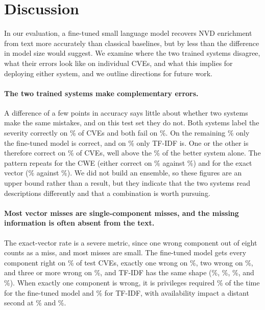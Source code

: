 \section{Discussion}\label{sec:discussion}

In our evaluation, a fine-tuned small language model recovers NVD enrichment from text more accurately than classical baselines, but by less than the difference in model size would suggest.
We examine where the two trained systems disagree, what their errors look like on individual CVEs, and what this implies for deploying either system, and we outline directions for future work.

\paragraph{The two trained systems make complementary errors.}
A difference of a few points in accuracy says little about whether two systems make the same mistakes, and on this test set they do not.
Both systems label the severity correctly on \nBothSev\% of CVEs and both fail on \nNeitherSev\%.
On the remaining \nLoRAOnlySev\% only the fine-tuned model is correct, and on \nLROnlySev\% only TF-IDF is.
One or the other is therefore correct on \nEitherSev\% of CVEs, well above the \nLoRAfSev\% of the better system alone.
The pattern repeats for the CWE (either correct on \nEitherCwe\% against \nLoRAfCwe\%) and for the exact vector (\nEitherVec\% against \nLoRAfVec\%).
We did not build an ensemble, so these figures are an upper bound rather than a result, but they indicate that the two systems read descriptions differently and that a combination is worth pursuing.

\paragraph{Most vector misses are single-component misses, and the missing information is often absent from the text.}
The exact-vector rate is a severe metric, since one wrong component out of eight counts as a miss, and most misses are small.
The fine-tuned model gets every component right on \nLoRAfVecZero\% of test CVEs, exactly one wrong on \nLoRAfVecOne\%, two wrong on \nLoRAfVecTwo\%, and three or more wrong on \nLoRAfVecThreePlus\%, and TF-IDF has the same shape (\nLRfVecZero\%, \nLRfVecOne\%, \nLRfVecTwo\%, and \nLRfVecThreePlus\%).
When exactly one component is wrong, it is privileges required \nLoRAfSolePR\% of the time for the fine-tuned model and \nLRfSolePR\% for TF-IDF, with availability impact a distant second at \nLoRAfSoleAvail\% and \nLRfSoleAvail\%.

